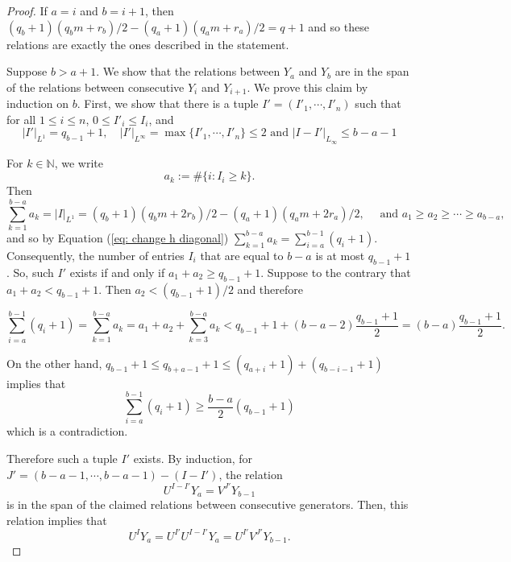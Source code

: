 \documentclass[10pt,a4paper]{amsart}
\newcommand{\cHFL}{\mathcal{H\!F\! L}}
\newcommand{\cc}{\mathbf{c}}
\begin{document}
\begin{proof}
If $a=i$ and $b=i+1$, then $(q_b+1)(q_b m+r_b)/2-(q_a+1)(q_a m+r_a)/2=q+1$ and so these relations are exactly the ones described in the statement.




Suppose $b>a+1$. We show that the relations between $Y_a$ and $Y_b$ are in the span of the relations between consecutive $Y_i$ and $Y_{i+1}$. We prove this claim by induction on $b$. First, we show that there is a tuple $I'=(I'_1,\cdots,I'_{n})$ such that for all $1\leq i\leq n$, $0\leq I'_i\leq I_i$, and
$$|I'|_{L^1}=q_{b-1}+1, \quad |I'|_{L^\infty}=\max\{I'_1,\cdots,I'_{n}\}\leq 2 \text{ and } |I-I'|_{L_{\infty}}\le b-a-1$$

For $k\in \mathbb{N}$, we write
$$a_k:=\# \{i: I_i\geq k\}.$$
Then 
$$\sum_{k=1}^{b-a} a_k=|I|_{L^1}=(q_b+1)(q_b m+2r_b)/2-(q_a+1)(q_a m+2r_a)/2, \quad \text{ and } a_1\geq a_2\geq \cdots \geq a_{b-a},$$
and so by Equation (\ref{eq: change h diagonal}) $\sum_{k=1}^{b-a}a_k=\sum_{i=a}^{b-1}(q_i+1)$. Consequently, the number of entries $I_i$ that are equal to $b-a$ is at most $q_{b-1}+1$. So, such $I'$ exists if and only if $a_1+a_2\geq q_{b-1}+1$. Suppose to the contrary that 
$a_1+a_2< q_{b-1}+1$. Then $a_2<(q_{b-1}+1)/2$ and therefore

$$\sum_{i=a}^{b-1}(q_i+1)=\sum_{k=1}^{b-a} a_k=a_1+a_2+\sum_{k=3}^{b-a}a_k< q_{b-1}+1+(b-a-2) \dfrac{q_{b-1}+1}{2}=(b-a)\frac{q_{b-1}+1}{2}.$$

On the other hand, $q_{b-1}+1\le q_{b+a-1}+1\le (q_{a+i}+1)+(q_{b-i-1}+1)$ implies that 
\[\sum_{i=a}^{b-1}(q_i+1)\ge \frac{b-a}{2}(q_{b-1}+1)\]
which is a contradiction. 









Therefore such a tuple $I'$ exists. By induction, for $J'=(b-a-1, \cdots, b-a-1)-(I-I')$, the relation 
$$U^{I-I'}Y_a=V^{J'} Y_{b-1}$$
is in the span of the claimed relations between consecutive generators. Then, this relation implies that 
$$U^I Y_a=U^{I'} U^{I-I'}Y_a=U^{I'} V^{J'}Y_{b-1}.$$


\end{proof}
\end{document}
